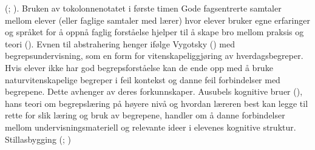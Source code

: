 \documentclass[main.tex]{subfiles}
\begin{document}
(; ). Bruken av tokolonnenotatet i første timen 
\newline
\newline
Gode fagsentrerte samtaler mellom elever (eller faglige samtaler med lærer) hvor elever bruker egne 
erfaringer og språket for å oppnå faglig forståelse hjelper til å skape bro mellom praksis og teori 
().
\newline
\newline
Evnen til abstrahering henger ifølge Vygotsky () med begrepsundervisning, som en
form for vitenskapeliggjøring av hverdagsbegreper. Hvis elever ikke har god begrepsforståelse
kan de ende opp med å bruke naturvitenskapelige begreper i feil kontekst og danne feil 
forbindelser med begrepene. Dette avhenger av deres forkunnskaper. Ausubels kognitive bruer 
(), hans teori om begrepslæring på høyere nivå og hvordan læreren best kan 
legge til rette for slik læring og bruk av begrepene,  handler om å danne forbindelser mellom 
undervisningsmateriell og relevante ideer i elevenes kognitive struktur.
\newline
\newline
Stillasbygging (; )

\end{document}
